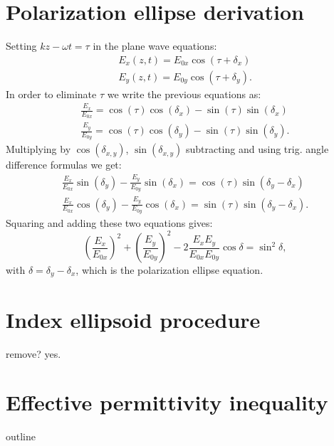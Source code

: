 \section{Polarization ellipse derivation}
\label{sec:deriv_pol_ellipse}
Setting $kz-\omega t=\tau$ in the plane wave equations:
\begin{equation}
\begin{aligned}
    E_x(z, t) = E_{0x}\cos(\tau + \delta_x) \\
    E_y(z, t) = E_{0y}\cos(\tau + \delta_y).
\end{aligned}
\end{equation}
In order to eliminate $\tau$ we write the previous equations as:
\begin{equation}
\begin{aligned}
    \frac{E_x}{E_{0x}} = \cos(\tau)\cos(\delta_x) - \sin(\tau)\sin(\delta_x)\\
    \frac{E_y}{E_{0y}} = \cos(\tau)\cos(\delta_y) - \sin(\tau)\sin(\delta_y).
\end{aligned}
\end{equation}
Multiplying by $\cos(\delta_{x,y})$, $\sin(\delta_{x,y})$ subtracting and using trig. angle difference formulas we get:
\begin{equation}
\begin{aligned}
    \frac{E_x}{E_{0x}}\sin(\delta_y) - \frac{E_y}{E_{0y}}\sin(\delta_x) = \cos(\tau)\sin(\delta_y-\delta_x)\\
    \frac{E_x}{E_{0x}}\cos(\delta_y) - \frac{E_y}{E_{0y}}\cos(\delta_x) = \sin(\tau)\sin(\delta_y-\delta_x).
\end{aligned}
\end{equation}
Squaring and adding these two equations gives:
\begin{equation}
    \left(\frac{E_x}{E_{0x}}\right)^2+\left(\frac{E_y}{E_{0y}}\right)^2-2\frac{E_x E_y}{E_{0x} E_{0y}}\cos \delta =\sin^2 \delta,
\end{equation}
with $\delta=\delta_y-\delta_x$, which is the polarization ellipse equation.

\section{Index ellipsoid procedure}
\label{sec:index_ellipse_proof}
remove? yes.

\section{Effective permittivity inequality}
\label{sec:bf_proof}
outline


